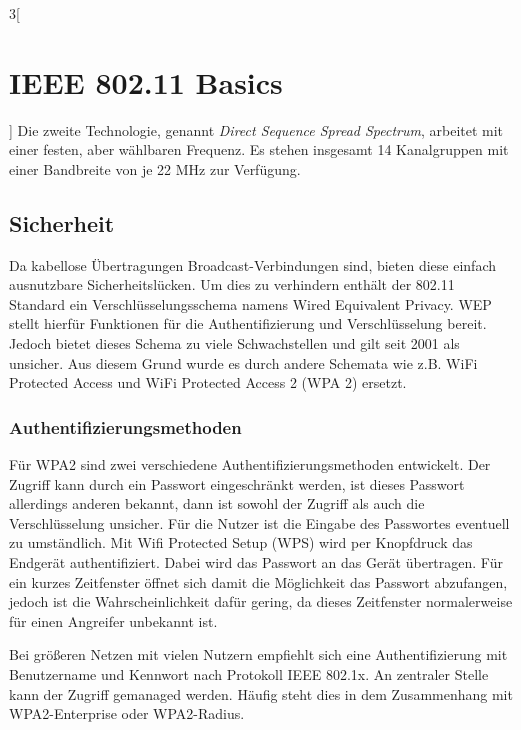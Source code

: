 \begin{multicols}{3}[\section{IEEE 802.11 Basics}]
Die zweite Technologie, genannt \textit{Direct Sequence Spread Spectrum},
arbeitet mit einer festen, aber wählbaren Frequenz. Es stehen insgesamt 14 Kanalgruppen mit einer Bandbreite von je 22 MHz zur Verfügung. 
~\cite{basics.4}


\subsection*{Sicherheit}

Da kabellose Übertragungen Broadcast-Verbindungen sind, bieten diese einfach ausnutzbare Sicherheitslücken. Um dies zu verhindern enthält der 802.11 Standard ein Verschlüsselungsschema namens Wired Equivalent Privacy. WEP stellt hierfür Funktionen für die Authentifizierung und Verschlüsselung bereit.
Jedoch bietet dieses Schema zu viele Schwachstellen und gilt seit 2001 als unsicher. Aus diesem Grund wurde es durch andere Schemata wie z.B. WiFi Protected Access und WiFi Protected Access 2 (WPA 2) ersetzt.~\cite{basics.2}
\subsubsection*{Authentifizierungsmethoden}
Für WPA2 sind zwei verschiedene Authentifizierungsmethoden entwickelt. Der Zugriff kann durch ein Passwort eingeschränkt werden, ist dieses Passwort allerdings anderen bekannt, dann ist sowohl der Zugriff als auch die Verschlüsselung unsicher. Für die Nutzer ist die Eingabe des Passwortes eventuell zu umständlich. Mit Wifi Protected Setup (WPS) wird per Knopfdruck das Endgerät authentifiziert. Dabei wird das Passwort an das Gerät übertragen. Für ein kurzes Zeitfenster öffnet sich damit die Möglichkeit das Passwort abzufangen, jedoch ist die Wahrscheinlichkeit dafür gering, da dieses Zeitfenster normalerweise für einen Angreifer unbekannt ist.

Bei größeren Netzen mit vielen Nutzern empfiehlt sich eine  Authentifizierung mit Benutzername und Kennwort nach Protokoll IEEE 802.1x. An zentraler Stelle kann der Zugriff gemanaged werden. Häufig steht dies in dem Zusammenhang mit WPA2-Enterprise oder WPA2-Radius. 
~\cite{basics.9,basics.11}
\end{multicols}
\newpage

